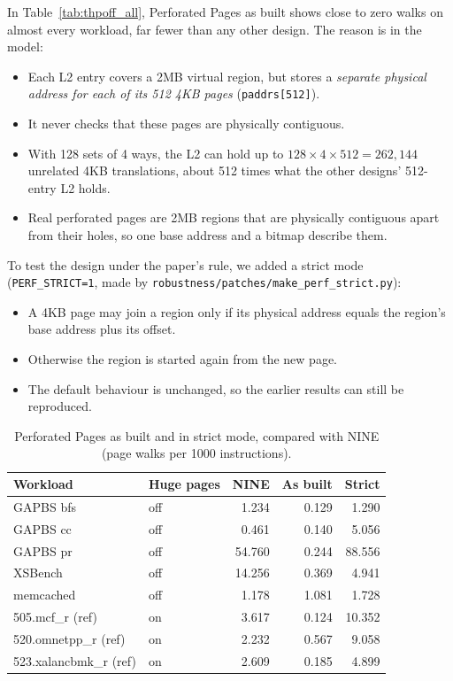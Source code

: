 In Table~\ref{tab:thpoff_all}, Perforated Pages as built shows close to zero walks on almost every workload, far fewer than any other design. The reason is in the model:
\begin{itemize}
    \item Each L2 entry covers a 2MB virtual region, but stores a \emph{separate physical address for each of its 512 4KB pages} (\texttt{paddrs[512]}).
    \item It never checks that these pages are physically contiguous.
    \item With 128 sets of 4 ways, the L2 can hold up to $128 \times 4 \times 512 = 262{,}144$ unrelated 4KB translations, about 512 times what the other designs' 512-entry L2 holds.
    \item Real perforated pages are 2MB regions that are physically contiguous apart from their holes, so one base address and a bitmap describe them.
\end{itemize}

To test the design under the paper's rule, we added a strict mode (\texttt{PERF\_STRICT=1}, made by \texttt{robustness/patches/make\_perf\_strict.py}):
\begin{itemize}
    \item A 4KB page may join a region only if its physical address equals the region's base address plus its offset.
    \item Otherwise the region is started again from the new page.
    \item The default behaviour is unchanged, so the earlier results can still be reproduced.
\end{itemize}

\begin{table}[H]
\centering
\small
\caption{Perforated Pages as built and in strict mode, compared with NINE (page walks per 1000 instructions).}
\label{tab:perf_strict}
\begin{tabular}{l l r r r}
\toprule
\textbf{Workload} & \textbf{Huge pages} & \textbf{NINE} & \textbf{As built} & \textbf{Strict} \\
\midrule
GAPBS bfs & off & 1.234 & 0.129 & 1.290 \\
GAPBS cc & off & 0.461 & 0.140 & 5.056 \\
GAPBS pr & off & 54.760 & 0.244 & 88.556 \\
XSBench & off & 14.256 & 0.369 & 4.941 \\
memcached & off & 1.178 & 1.081 & 1.728 \\
505.mcf\_r (ref) & on & 3.617 & 0.124 & 10.352 \\
520.omnetpp\_r (ref) & on & 2.232 & 0.567 & 9.058 \\
523.xalancbmk\_r (ref) & on & 2.609 & 0.185 & 4.899 \\
\bottomrule
\end{tabular}
\end{table}

